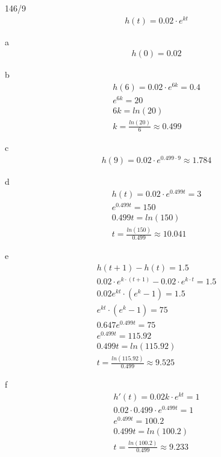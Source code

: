 \begin{exercise}{146/9}
  \begin{gather*}
    h(t) = 0.02 \cdot e^{kt}
  \end{gather*}
  \item [a]
  \begin{gather*}
    h(0) = 0.02
  \end{gather*}
  \item [b]
  \begin{gather*}
    h(6) = 0.02 \cdot e^{6k} = 0.4 \\
    e^{6k} = 20 \\
    6k = ln(20) \\
    k = \frac{ln(20)}{6} \approx 0.499
  \end{gather*}
  \item [c]
  \begin{gather*}
    h(9) = 0.02 \cdot e^{0.499 \cdot 9} \approx 1.784
  \end{gather*}
  \item [d]
  \begin{gather*}
    h(t) = 0.02 \cdot e^{0.499t} = 3 \\
    e^{0.499t} = 150 \\
    0.499t = ln(150) \\
    t = \frac{ln(150)}{0.499} \approx 10.041
  \end{gather*}
  \item [e]
  \begin{gather*}
    h(t + 1) - h(t) = 1.5 \\
    0.02 \cdot e^{k \cdot (t + 1)} - 0.02 \cdot e^{k \cdot t} = 1.5 \\
    0.02e^{kt} \cdot (e^k - 1) = 1.5 \\
    e^{kt} \cdot (e^k - 1) = 75 \\
    0.647e^{0.499t} = 75 \\
    e^{0.499t} = 115.92 \\
    0.499t = ln(115.92) \\
    t = \frac{ln(115.92)}{0.499} \approx 9.525 
  \end{gather*}
  \item [f]
  \begin{gather*}
    h'(t) = 0.02k \cdot e^{kt} = 1 \\
    0.02 \cdot 0.499 \cdot e^{0.499t} = 1 \\
    e^{0.499t} = 100.2 \\
    0.499t = ln(100.2) \\
    t = \frac{ln(100.2)}{0.499} \approx 9.233

\end{gather*}
\end{exercise}

